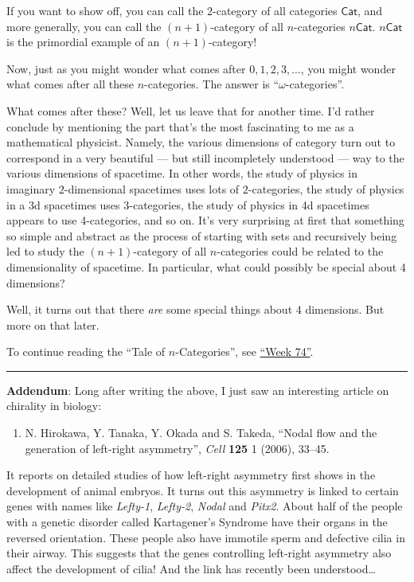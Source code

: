 \documentclass{article}
\def\tightlist{}
\begin{document}
If you want to show off, you can call the \(2\)-category of all
categories \(\mathsf{Cat}\), and more generally, you can call the
\((n+1)\)-category of all \(n\)-categories \(n\mathsf{Cat}\).
\(n\mathsf{Cat}\) is the primordial example of an \((n+1)\)-category!

Now, just as you might wonder what comes after \(0,1,2,3,\ldots\), you
might wonder what comes after all these \(n\)-categories. The answer is
``\(\omega\)-categories''.

What comes after these? Well, let us leave that for another time. I'd
rather conclude by mentioning the part that's the most fascinating to me
as a mathematical physicist. Namely, the various dimensions of category
turn out to correspond in a very beautiful --- but still incompletely
understood --- way to the various dimensions of spacetime. In other
words, the study of physics in imaginary \(2\)-dimensional spacetimes
uses lots of \(2\)-categories, the study of physics in a 3d spacetimes
uses 3-categories, the study of physics in 4d spacetimes appears to use
4-categories, and so on. It's very surprising at first that something so
simple and abstract as the process of starting with sets and recursively
being led to study the \((n+1)\)-category of all \(n\)-categories could
be related to the dimensionality of spacetime. In particular, what could
possibly be special about 4 dimensions?

Well, it turns out that there \emph{are} some special things about 4
dimensions. But more on that later.

To continue reading the ``Tale of \(n\)-Categories'', see
\protect\hyperlink{week74}{``Week 74''}.

\begin{center}\rule{0.5\linewidth}{0.5pt}\end{center}

\textbf{Addendum}: Long after writing the above, I just saw an
interesting article on chirality in biology:

\begin{enumerate}
\def\labelenumi{\arabic{enumi})}
\setcounter{enumi}{1}
\tightlist
\item
  N. Hirokawa, Y. Tanaka, Y. Okada and S. Takeda, ``Nodal flow and the
  generation of left-right asymmetry'', \emph{Cell} \textbf{125} 1
  (2006), 33--45.
\end{enumerate}

It reports on detailed studies of how left-right asymmetry first shows
in the development of animal embryos. It turns out this asymmetry is
linked to certain genes with names like \emph{Lefty-1}, \emph{Lefty-2},
\emph{Nodal} and \emph{Pitx2}. About half of the people with a genetic
disorder called Kartagener's Syndrome have their organs in the reversed
orientation. These people also have immotile sperm and defective cilia
in their airway. This suggests that the genes controlling left-right
asymmetry also affect the development of cilia! And the link has
recently been understood\ldots{}
\end{document}
